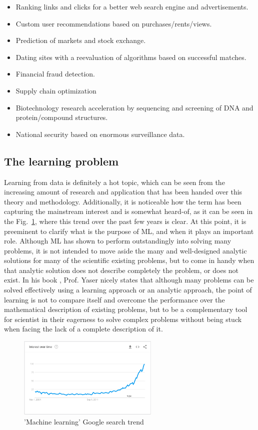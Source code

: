 \begin{itemize}
    \item Ranking links and clicks for a better web search engine and advertisements.
    \item Custom user recommendations based on purchases/rents/views.
    \item Prediction of markets and stock exchange.
    \item Dating sites with a reevaluation of algorithms based on successful matches.
    \item Financial fraud detection.
    \item Supply chain optimization
    \item Biotechnology research acceleration by sequencing and screening of DNA and protein/compound structures.
    \item National security based on enormous surveillance data.
\end{itemize}

\subsection{The learning problem}
Learning from data is definitely a hot topic, which can be seen from the increasing amount of research and application that has been handed over this theory and methodology. Additionally, it is noticeable how the term has been capturing the mainstream interest and is somewhat heard-of, as it can be seen in the Fig.~\ref{fig:ml_trend}, where this trend over the past few years is clear. At this point, it is preeminent to clarify what is the purpose of \ac{ML}, and when it plays an important role. Although \ac{ML} has shown to perform outstandingly into solving many problems, it is not intended to move aside the many and well-designed analytic solutions for many of the scientific existing problems, but to come in handy when that analytic solution does not describe completely the problem, or does not exist. In his book \cite{Yaser}, Prof. Yaser nicely states that although many problems can be solved effectively using a learning approach or an analytic approach, the point of learning is not to compare itself and overcome the performance over the mathematical description of existing problems, but to be a complementary tool for scientist in their eagerness to solve complex problems without being stuck when facing the lack of a complete description of it.

\begin{figure}[htb]
    \centering
      \includegraphics[width=0.6\textwidth]{figures/ml_trend.png}
      \caption{'Machine learning' Google search trend \cite{GoogleInc.2017}}
      \label{fig:ml_trend}
\end{figure}

